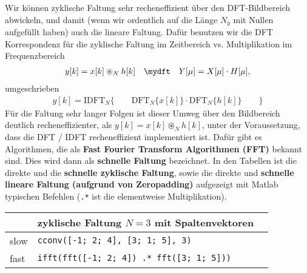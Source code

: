 \begin{ExCalc}
Wir können zyklische Faltung sehr recheneffizient über den DFT-Bildbereich
abwickeln, und damit (wenn wir ordentlich auf die Länge $N_y$ mit Nullen aufgefüllt haben)
auch die lineare Faltung.
%
Dafür benutzen wir die DFT Korrespondenz für die zyklische Faltung im
Zeitbereich vs. Multiplikation im Frequenzbereich
\begin{align}
y[k] = x[k] \circledast_N h[k] \quad\mydft\quad Y[\mu] = X[\mu] \cdot H[\mu],
\end{align}
umgeschrieben
\begin{align}
y[k] = \mathrm{IDFT}_N\{\qquad\mathrm{DFT}_N\{x[k]\} \cdot \mathrm{DFT}_N\{h[k]\}\qquad\}
\end{align}
Für die Faltung sehr langer Folgen ist dieser Umweg über den Bildbereich deutlich
recheneffizienter, als $y[k] = x[k] \circledast_N h[k]$, unter der Voraussetzung,
dass die DFT / IDFT recheneffizient implementiert ist. Dafür gibt es Algorithmen,
die als \textbf{Fast Fourier Transform Algorithmen (FFT)} bekannt sind.
%
Dies wird dann als \textbf{schnelle Faltung} bezeichnet. In den Tabellen
ist die direkte und die \textbf{schnelle zyklische Faltung}, sowie
die direkte und \textbf{schnelle
lineare Faltung (aufgrund von Zeropadding)} aufgezeigt mit Matlab
typischen Befehlen (\texttt{.*} ist die elementweise Multiplikation).
%
\end{ExCalc}


\begin{table}[h]
\centering
\begin{tabular}{| l | l | l |}
\hline
& zyklische Faltung $N=3$ mit Spaltenvektoren\\\hline
slow  & \texttt{cconv([-1; 2; 4], [3; 1; 5], 3)} \\\hline
fast  & \texttt{ifft(fft([-1; 2; 4]) .* fft([3; 1; 5]))}\\\hline
\end{tabular}
\end{table}



